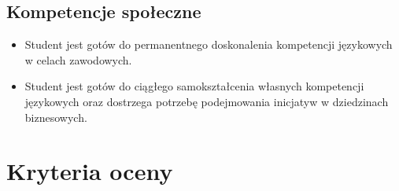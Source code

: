 \documentclass[12pt, a4paper]{article}
\begin{document}
\subsection*{Kompetencje społeczne}
\begin{itemize}
  \item Student jest gotów do permanentnego doskonalenia kompetencji językowych w celach zawodowych.
  \item Student jest gotów do ciągłego samokształcenia własnych kompetencji językowych oraz dostrzega potrzebę podejmowania inicjatyw w dziedzinach biznesowych.
\end{itemize}

\section{Kryteria oceny}
\end{document}
